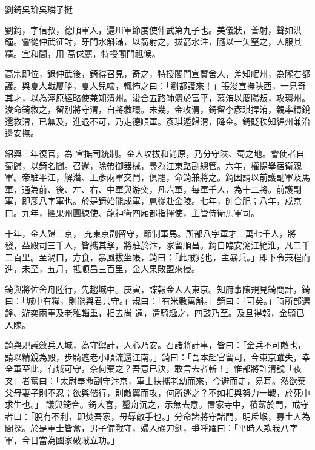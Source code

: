 
\begin{pinyinscope}

 劉錡吳玠吳璘子挺



 劉錡，字信叔，德順軍人，滬川軍節度使仲武第九子也。美儀狀，善射，聲如洪鐘。嘗從仲武征討，牙門水斛滿，以箭射之，拔箭水注，隨以一矢窒之，人服其精。宣和間，用
 高俅薦，特授閣門祗候。



 高宗即位，錄仲武後，錡得召見，奇之，特授閣門宣贊舍人，差知岷州，為隴右都護。與夏人戰屢勝，夏人兒啼，輒怖之曰：「劉都護來！」張浚宣撫陜西，一見奇其才，以為涇原經略使兼知渭州。浚合五路師潰於富平，慕洧以慶陽叛，攻環州。浚命錡救之，留別將守渭，自將救環。未幾，金攻渭，錡留李彥琪捍洧，親率精銳還救渭，已無及，進退不可，乃走德順軍。彥琪遁歸渭，降金。錡貶秩知綿州兼沿邊安撫。



 紹興三年復官，為
 宣撫司統制。金人攻拔和尚原，乃分守陜、蜀之地。會使者自蜀歸，以錡名聞。召還，除帶御器械，尋為江東路副總管。六年，權提舉宿衛親軍。帝駐平江，解潛、王彥兩軍交鬥，俱罷，命錡兼將之。錡因請以前護副軍及馬軍，通為前、後、左、右、中軍與游奕，凡六軍，每軍千人，為十二將。前護副軍，即彥八字軍也。於是錡始能成軍，扈從赴金陵。七年，帥合肥；八年，戍京口。九年，擢果州團練使、龍神衛四廂都指揮使，主管侍衛馬軍司。



 十年，金人歸三京，
 充東京副留守，節制軍馬。所部八字軍才三萬七千人，將發，益殿司三千人，皆攜其孥，將駐於汴，家留順昌。錡自臨安溯江絕淮，凡二千二百里。至渦口，方食，暴風拔坐帳，錡曰：「此賊兆也，主暴兵。」即下令兼程而進，未至，五月，抵順昌三百里，金人果敗盟來侵。



 錡與將佐舍舟陸行，先趨城中。庚寅，諜報金人入東京。知府事陳規見錡問計，錡曰：「城中有糧，則能與君共守。」規曰：「有米數萬斛。」錡曰：「可矣。」時所部選鋒、游奕兩軍及老稚輜重，相去尚
 遠，遣騎趣之，四鼓乃至。及旦得報，金騎已入陳。



 錡與規議斂兵入城，為守禦計，人心乃安。召諸將計事，皆曰：「金兵不可敵也，請以精銳為殿，步騎遮老小順流還江南。」錡曰：「吾本赴官留司，今東京雖失，幸全軍至此，有城可守，奈何棄之？吾意已決，敢言去者斬！」惟部將許清號「夜叉」者奮曰：「太尉奉命副守汴京，軍士扶攜老幼而來，今避而走，易耳。然欲棄父母妻子則不忍；欲與偕行，則敵翼而攻，何所逃之？不如相與努力一戰，於死中求生也。」
 議與錡合。錡大喜，鑿舟沉之，示無去意。置家寺中，積薪於門，戒守者曰：「脫有不利，即焚吾家，毋辱敵手也。」分命諸將守諸門，明斥堠，募土人為間探。於是軍士皆奮，男子備戰守，婦人礪刀劍，爭呼躍曰：「平時人欺我八字軍，今日當為國家破賊立功。」




\end{pinyinscope}
